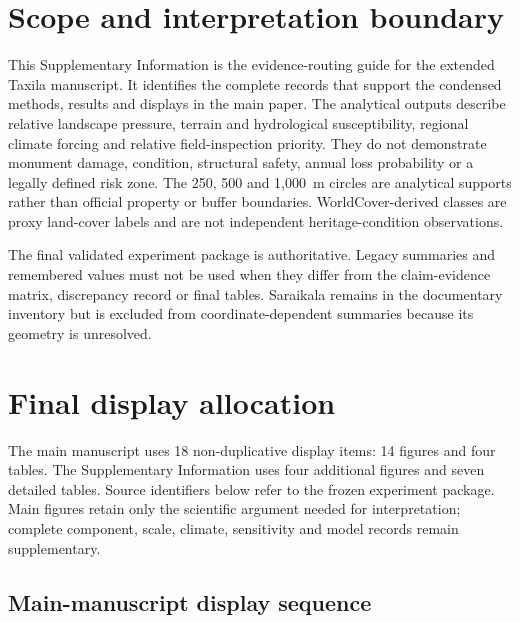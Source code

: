 \section{Scope and interpretation boundary}

This Supplementary Information is the evidence-routing guide for the extended Taxila manuscript. It identifies the complete records that support the condensed methods, results and displays in the main paper. The analytical outputs describe relative landscape pressure, terrain and hydrological susceptibility, regional climate forcing and relative field-inspection priority. They do not demonstrate monument damage, condition, structural safety, annual loss probability or a legally defined risk zone. The 250, 500 and 1,000~m circles are analytical supports rather than official property or buffer boundaries. WorldCover-derived classes are proxy land-cover labels and are not independent heritage-condition observations.

The final validated experiment package is authoritative. Legacy summaries and remembered values must not be used when they differ from the claim-evidence matrix, discrepancy record or final tables. Saraikala remains in the documentary inventory but is excluded from coordinate-dependent summaries because its geometry is unresolved.

\section{Final display allocation}

The main manuscript uses 18 non-duplicative display items: 14 figures and four tables. The Supplementary Information uses four additional figures and seven detailed tables. Source identifiers below refer to the frozen experiment package. Main figures retain only the scientific argument needed for interpretation; complete component, scale, climate, sensitivity and model records remain supplementary.

\subsection{Main-manuscript display sequence}

\setcounter{table}{-2}

